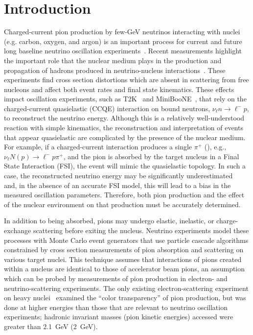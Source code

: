 \section{Introduction}
\label{sec:intro}
Charged-current pion production by few-GeV neutrinos interacting 
with nuclei (e.g. carbon, oxygen, and argon) is an important process 
for current and future long baseline neutrino oscillation 
experiments~\cite{Abe:2011ks,Ayres:2004js,LBNE}.  
Recent measurements highlight the important role that the nuclear medium plays
in the production and propagation of hadrons produced in neutrino-nucleus
interactions~\cite{MINERVAnuprl,MINERVAnubarprl,mboone-ccqe,mboone-ccqe-nubar}.
These experiments find cross section distortions which are absent in scattering from free
nucleons and affect both event rates and final state kinematics.  
These effects impact oscillation experiments, such as T2K~\cite{t2k-theta13} 
and MiniBooNE~\cite{AguilarArevalo:2010wv}, that rely on the charged-current quasielastic (CCQE)
interaction on bound neutrons, $\nu_\ell n \rightarrow \ell^{-} p$, 
to reconstruct the neutrino energy.  Although this is a relatively 
well-understood reaction with simple kinematics, the reconstruction
and interpretation of events that appear quasielastic 
are complicated by the presence of the nuclear medium.
For example, if a charged-current interaction produces a single $\pi^{+}$ (\cconepiplus),
e.g., $\nu_\ell N(p) \rightarrow \ell^{-} p \pi^{+}$, and the pion is 
absorbed by the target nucleus in a Final State Interaction (FSI), 
the event will mimic the quasielastic topology.
In such a case, the reconstructed neutrino energy may
be significantly underestimated~\cite{Lalakulich:2012hs} and, in the absence of an accurate FSI model, this will lead to a 
bias in the measured oscillation parameters.  Therefore, both
pion production and the effect of the nuclear environment on that 
production must be accurately determined.  

In addition to being absorbed,
pions may undergo elastic, inelastic, or charge-exchange scattering before exiting the nucleus.  Neutrino experiments 
model these processes with Monte Carlo event generators that use particle cascade algorithms constrained by 
cross section measurements of pion
absorption and scattering on various target nuclei.
This technique assumes that interactions of pions created within a nucleus are identical to those of accelerator beam pions, an
assumption which can be probed by measurements of pion production
in electron- and neutrino-scattering experiments.
The only existing electron-scattering experiment on heavy nuclei~\cite{Qian:2009aa} examined 
the ``color transparency'' of pion production, but was done at 
higher energies than those that are relevant to neutrino oscillation experiments;   
hadronic invariant masses (pion kinetic energies) accessed were 
greater than 2.1~GeV (2~GeV).

